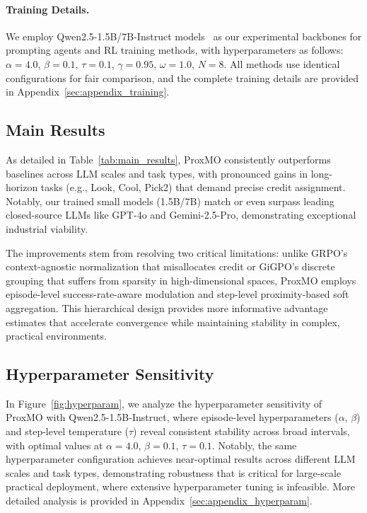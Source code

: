 \documentclass[11pt]{article}
\begin{document}
\paragraph{Training Details.}
We employ Qwen2.5-1.5B/7B-Instruct models~\cite{qwen2025qwen24technicalreport} as our experimental backbones for prompting agents and RL training methods, with hyperparameters as follows: $\alpha=4.0$, $\beta=0.1$, $\tau=0.1$, $\gamma=0.95$, $\omega=1.0$, $N=8$. All methods use identical configurations for fair comparison, and the complete training details are provided in Appendix~\ref{sec:appendix_training}.

\subsection{Main Results}
As detailed in Table~\ref{tab:main_results}, ProxMO consistently outperforms baselines across LLM scales and task types, with pronounced gains in long-horizon tasks (e.g., Look, Cool, Pick2) that demand precise credit assignment. Notably, our trained small models (1.5B/7B) match or even surpass leading closed-source LLMs like GPT-4o and Gemini-2.5-Pro, demonstrating exceptional industrial viability. 

The improvements stem from resolving two critical limitations: unlike GRPO's context-agnostic normalization that misallocates credit or GiGPO's discrete grouping that suffers from sparsity in high-dimensional spaces, ProxMO employs episode-level success-rate-aware modulation and step-level proximity-based soft aggregation. This hierarchical design provides more informative advantage estimates that accelerate convergence while maintaining stability in complex, practical environments.

\subsection{Hyperparameter Sensitivity}
In Figure~\ref{fig:hyperparam}, we analyze the hyperparameter sensitivity of ProxMO with Qwen2.5-1.5B-Instruct, where episode-level hyperparameters ($\alpha$, $\beta$) and step-level temperature ($\tau$) reveal consistent stability across broad intervals, with optimal values at $\alpha=4.0$, $\beta=0.1$, $\tau=0.1$. Notably, the same hyperparameter configuration achieves near-optimal results across different LLM scales and task types, demonstrating robustness that is critical for large-scale practical deployment, where extensive hyperparameter tuning is infeasible. More detailed analysis is provided in Appendix~\ref{sec:appendix_hyperparam}.
\end{document}
